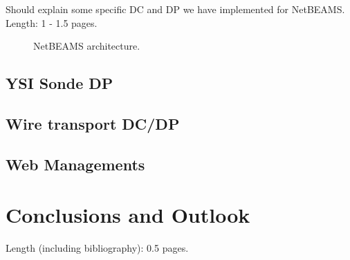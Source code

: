 \documentclass[conference]{IEEEtran}
\begin{document}
Should explain some specific DC and DP we have implemented for
NetBEAMS. Length: 1 - 1.5 pages.

\begin{figure*}
\centering
{}
\caption{\label{FIG_NETBEAMS} NetBEAMS architecture.}
\end{figure*}

\subsection{YSI Sonde DP}

\subsection{Wire transport DC/DP}

\subsection{Web Managements}


\section{Conclusions and Outlook}

Length (including bibliography): 0.5 pages.

%
%
\end{document}
